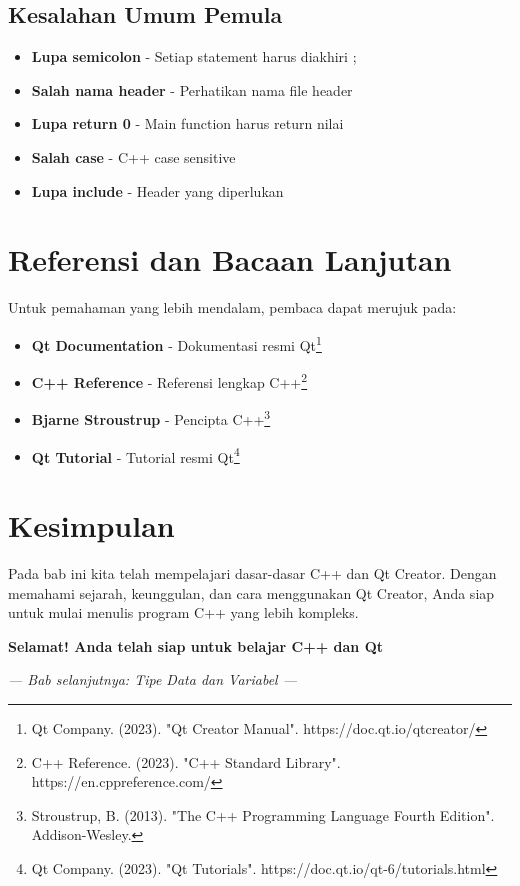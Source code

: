 \subsection{Kesalahan Umum Pemula}

\begin{itemize}
\item \textbf{Lupa semicolon} - Setiap statement harus diakhiri ;
\item \textbf{Salah nama header} - Perhatikan nama file header
\item \textbf{Lupa return 0} - Main function harus return nilai
\item \textbf{Salah case} - C++ case sensitive
\item \textbf{Lupa include} - Header yang diperlukan
\end{itemize}

\section{Referensi dan Bacaan Lanjutan}

Untuk pemahaman yang lebih mendalam, pembaca dapat merujuk pada:

\begin{itemize}
\item \textbf{Qt Documentation} - Dokumentasi resmi Qt\footnote{Qt Company. (2023). "Qt Creator Manual". https://doc.qt.io/qtcreator/}
\item \textbf{C++ Reference} - Referensi lengkap C++\footnote{C++ Reference. (2023). "C++ Standard Library". https://en.cppreference.com/}
\item \textbf{Bjarne Stroustrup} - Pencipta C++\footnote{Stroustrup, B. (2013). "The C++ Programming Language Fourth Edition". Addison-Wesley.}
\item \textbf{Qt Tutorial} - Tutorial resmi Qt\footnote{Qt Company. (2023). "Qt Tutorials". https://doc.qt.io/qt-6/tutorials.html}
\end{itemize}

\section{Kesimpulan}

Pada bab ini kita telah mempelajari dasar-dasar C++ dan Qt Creator. Dengan memahami sejarah, keunggulan, dan cara menggunakan Qt Creator, Anda siap untuk mulai menulis program C++ yang lebih kompleks.

\begin{center}
\textbf{Selamat! Anda telah siap untuk belajar C++ dan Qt}
\end{center}

\vspace{1cm}

\begin{center}
\textit{--- Bab selanjutnya: Tipe Data dan Variabel ---}
\end{center}
